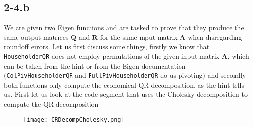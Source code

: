 \documentclass{article}
\begin{document}
 \subsection*{2-4.b}
 We are given two Eigen functions and are tasked to prove that they produce the same output matrices $\mathbf{Q}$ and $\mathbf{R}$ for the same input matrix $\mathbf{A}$ when disregarding roundoff errors. Let us first discuss some things, firstly we know that \verb|HouseholderQR| does not employ permutations of the given input matrix $\mathbf{A}$, which can be taken from the hint or from the Eigen documentation (\verb|ColPivHouseholderQR| and \verb|FullPivHouseholderQR| do us pivoting) and secondly both functions only compute the economical QR-decomposition, as the hint tells us. First let us look at the code segment that uses the Cholesky-decomposition to compute the QR-decomposition

 \begin{figure}[!hbt]
    \centering
\texttt{[image: QRDecompCholesky.png]}
\end{figure}
\end{document}
